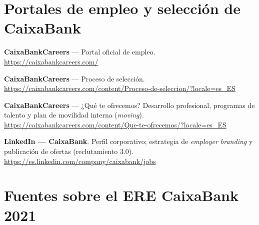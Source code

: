 \section*{Portales de empleo y selección de CaixaBank}

\begin{enumerate}[label={[\arabic*]}, resume]

  \item \textbf{CaixaBankCareers} --- Portal oficial de empleo.\\
        \url{https://caixabankcareers.com/}

  \item \textbf{CaixaBankCareers} --- Proceso de selección.\\
        \url{https://caixabankcareers.com/content/Proceso-de-seleccion/?locale=es_ES}

  \item \textbf{CaixaBankCareers} --- ¿Qué te ofrecemos? Desarrollo profesional,
        programas de talento y plan de movilidad interna (\textit{moving}).\\
        \url{https://caixabankcareers.com/content/Que-te-ofrecemos/?locale=es_ES}

  \item \textbf{LinkedIn --- CaixaBank}. Perfil corporativo; estrategia de
        \textit{employer branding} y publicación de ofertas (reclutamiento 3.0).\\
        \url{https://es.linkedin.com/company/caixabank/jobs}

\end{enumerate}

\section*{Fuentes sobre el ERE CaixaBank 2021}

